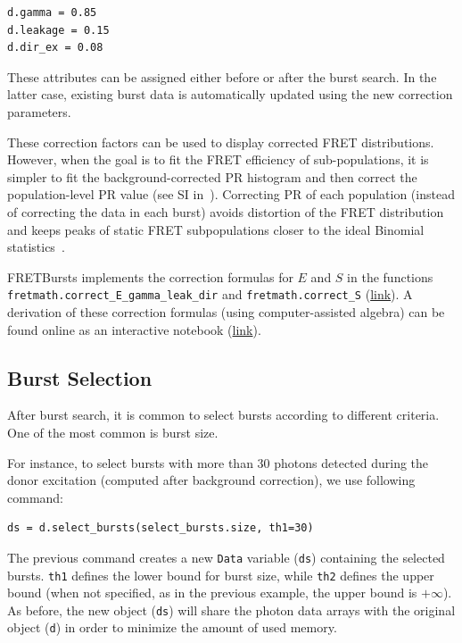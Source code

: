 \documentclass[10pt,letterpaper]{article}
\begin{document}
\begin{lstlisting}
d.gamma = 0.85
d.leakage = 0.15
d.dir_ex = 0.08
\end{lstlisting}

These attributes can be assigned either before or after the burst search. In the
latter case, existing burst data is automatically updated using the new
correction parameters.

These correction factors can be used to display corrected FRET distributions.
However, when the goal is to fit the FRET efficiency of sub-populations,
it is simpler to fit the background-corrected
PR histogram and then correct the population-level PR value (see SI in~\cite{Lee_2005}).
Correcting PR of each population (instead of correcting the data in each burst)
avoids distortion of the FRET distribution and keeps peaks of
static FRET subpopulations closer to the ideal Binomial statistics~\cite{Gopich_2007}.

FRETBursts implements the correction formulas for $E$ and $S$ in the functions
\verb|fretmath.correct_E_gamma_leak_dir| and \verb|fretmath.correct_S|
(\href{http://fretbursts.readthedocs.org/en/latest/fretmath.html}{link}).
A derivation of these correction formulas (using computer-assisted algebra)
can be found online as an interactive notebook (\href{http://nbviewer.jupyter.org/github/tritemio/notebooks/blob/master/Derivation%20of%20FRET%20and%20S%20correction%20formulas.ipynb}{link}).


\subsection*{Burst Selection}
\label{sec:burstsel}

After burst search, it is common to select bursts according to different
criteria. One of the most common is burst size.

For instance, to select bursts with more than 30 photons detected during the donor excitation
(computed after background correction), we use following command:

\begin{lstlisting}
ds = d.select_bursts(select_bursts.size, th1=30)
\end{lstlisting}

The previous command creates a new \verb|Data| variable (\verb|ds|) containing
the selected bursts. \verb|th1| defines the lower bound for burst size, while
\verb|th2| defines the upper bound (when not specified, as in the previous example,
the upper bound is $+\infty$).
As before, the new object (\verb|ds|) will share the photon data
arrays with the original object (\verb|d|) in order to minimize the amount
of used memory.
\end{document}
